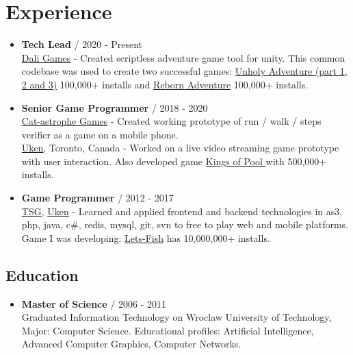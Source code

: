 \documentclass[12pt,a4paper]{article}
\begin{document}
\begin{multicols}{2}
\vfill


\centering
\section*{Experience }
\begin{itemize}[leftmargin=*]
	\item \textbf{Tech Lead} / 2020 - Present \\
		{\href{https://dali.games/}{Dali Games}} - Created scriptless adventure game tool for unity. This common codebase was used to create two successful games: {\href{https://play.google.com/store/apps/details?id=games.dali.adventure.neighborhood.unholy}{Unholy Adventure (part 1, 2 and 3)}} 100,000+ installs and {\href{https://play.google.com/store/apps/details?id=games.dali.adventure.reborn}{Reborn Adventure}} 100,000+ installs.   \\
	\item \textbf{Senior Game Programmer} / 2018 - 2020\\
		{\href{https://cat-astrophe-games.com/}{Cat-astrophe Games}} - Created working prototype of run / walk / steps verifier as a game on a mobile phone. \\
		{\href{https://www.uken.com/}{Uken}}, Toronto, Canada  - Worked on a live video streaming game prototype with user interaction. Also developed game {\href{https://play.google.com/store/apps/details?id=com.uken.pool}{Kings of Pool }} with  500,000+ installs.  \\
	\item \textbf{Game Programmer} / 2012 - 2017\\ 
		{\href{https://tensquaregames.com/}{TSG}}, {\href{https://www.uken.com/}{Uken}} - Learned and applied frontend and backend technologies in as3, php, java, c\#, redis, mysql, git, svn to free to play web and mobile platforms. Game I was developing: {\href{https://play.google.com/store/apps/details?id=air.com.tensquaregames.letsfish}{Lets-Fish}} has 10,000,000+ installs.    \\	 
\end{itemize}

\begin{samepage} \section*{Education }
\begin{itemize}[leftmargin=*]
	\item \textbf{Master of Science} / 2006 - 2011 \\
	Graduated Information Technology on Wroclaw University of Technology, Major: Computer Science. Educational profiles: Artificial Intelligence, Advanced Computer Graphics, Computer Networks.   \\	 
\end{itemize}\end{samepage}


\end{multicols}
\end{document}
